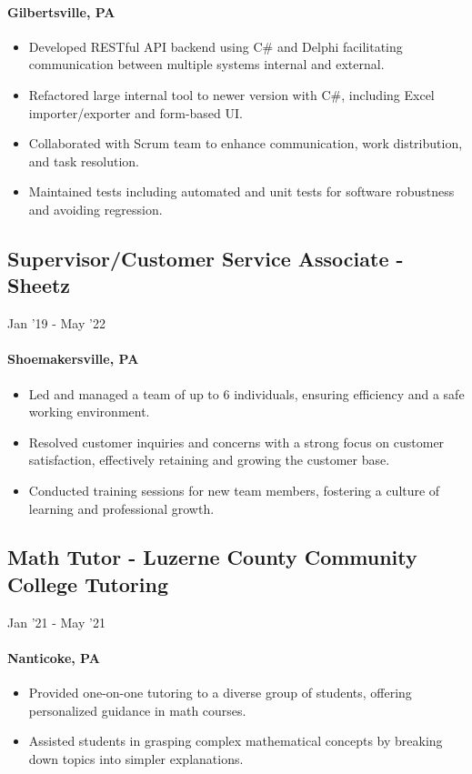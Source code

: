 \documentclass{article}
\begin{document}
\paragraph{Gilbertsville, PA}

\begin{itemize}
     \item Developed RESTful API backend using C\# and Delphi facilitating communication between multiple systems internal and external.
    \item Refactored large internal tool to newer version with C\#, including Excel importer/exporter and form-based UI.
    \item Collaborated with Scrum team to enhance communication, work distribution, and task resolution.
    \item Maintained tests including automated and unit tests for software robustness and avoiding regression.
\end{itemize}

\subsection{Supervisor/Customer Service Associate - Sheetz} \hfill Jan '19 - May '22
\paragraph{Shoemakersville, PA}
\begin{itemize}
  \item Led and managed a team of up to 6 individuals, ensuring efficiency and a safe working environment.
  \item Resolved customer inquiries and concerns with a strong focus on customer satisfaction, effectively retaining and growing the customer base.
  \item Conducted training sessions for new team members, fostering a culture of learning and professional growth.
\end{itemize}

\subsection{Math Tutor - Luzerne County Community College Tutoring} \hfill Jan '21 - May '21
\paragraph{Nanticoke, PA}
\begin{itemize}
  \item Provided one-on-one tutoring to a diverse group of students, offering personalized guidance in math courses.
  \item Assisted students in grasping complex mathematical concepts by breaking down topics into simpler explanations.
\end{itemize}
\end{document}
